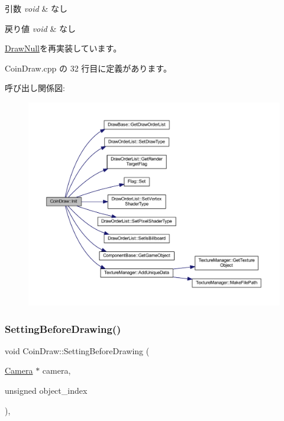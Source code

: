 \begin{DoxyParams}{引数}
{\em void} & なし \\
\hline
\end{DoxyParams}

\begin{DoxyRetVals}{戻り値}
{\em void} & なし \\
\hline
\end{DoxyRetVals}


\mbox{\hyperlink{class_draw_null_acd7fef3ccea1da537ac9507ffbb6dd2e}{Draw\+Null}}を再実装しています。



 Coin\+Draw.\+cpp の 32 行目に定義があります。

呼び出し関係図\+:\nopagebreak
\begin{figure}[H]
\begin{center}
\leavevmode
\includegraphics[width=350pt]{class_coin_draw_ad0f5da5cfb896541fd59b1ab4a8593d1_cgraph}
\end{center}
\end{figure}
\mbox{\label{class_coin_draw_a66c03acd675ac1820977cb21015abfdb}} 
\subsubsection{\texorpdfstring{Setting\+Before\+Drawing()}{SettingBeforeDrawing()}}
{\footnotesize\ttfamily void Coin\+Draw\+::\+Setting\+Before\+Drawing (\begin{DoxyParamCaption}\item[{\mbox{\hyperlink{class_camera}{Camera}} $\ast$}]{camera,  }\item[{unsigned}]{object\+\_\+index }\end{DoxyParamCaption})\hspace{0.3cm}{\ttfamily [override]}, {\ttfamily [virtual]}}




